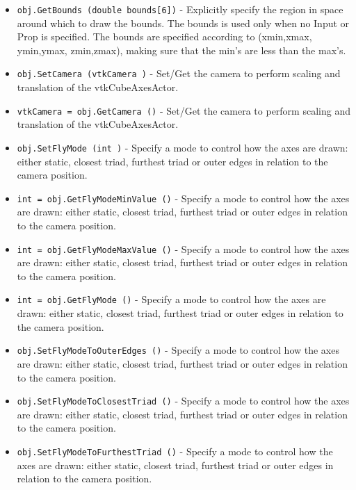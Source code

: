 \begin{itemize}
\item  \verb|obj.GetBounds (double bounds[6])| -  Explicitly specify the region in space around which to draw the bounds.
 The bounds is used only when no Input or Prop is specified. The bounds
 are specified according to (xmin,xmax, ymin,ymax, zmin,zmax), making
 sure that the min's are less than the max's.

\item  \verb|obj.SetCamera (vtkCamera )| -  Set/Get the camera to perform scaling and translation of the 
 vtkCubeAxesActor.

\item  \verb|vtkCamera = obj.GetCamera ()| -  Set/Get the camera to perform scaling and translation of the 
 vtkCubeAxesActor.

\item  \verb|obj.SetFlyMode (int )| -  Specify a mode to control how the axes are drawn: either static, 
 closest triad, furthest triad or outer edges in relation to the 
 camera position.

\item  \verb|int = obj.GetFlyModeMinValue ()| -  Specify a mode to control how the axes are drawn: either static, 
 closest triad, furthest triad or outer edges in relation to the 
 camera position.

\item  \verb|int = obj.GetFlyModeMaxValue ()| -  Specify a mode to control how the axes are drawn: either static, 
 closest triad, furthest triad or outer edges in relation to the 
 camera position.

\item  \verb|int = obj.GetFlyMode ()| -  Specify a mode to control how the axes are drawn: either static, 
 closest triad, furthest triad or outer edges in relation to the 
 camera position.

\item  \verb|obj.SetFlyModeToOuterEdges ()| -  Specify a mode to control how the axes are drawn: either static, 
 closest triad, furthest triad or outer edges in relation to the 
 camera position.

\item  \verb|obj.SetFlyModeToClosestTriad ()| -  Specify a mode to control how the axes are drawn: either static, 
 closest triad, furthest triad or outer edges in relation to the 
 camera position.

\item  \verb|obj.SetFlyModeToFurthestTriad ()| -  Specify a mode to control how the axes are drawn: either static, 
 closest triad, furthest triad or outer edges in relation to the 
 camera position.


\end{itemize}
